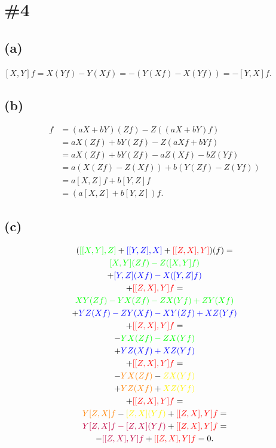 \documentclass{article}
\begin{document}
\section*{\#4}

\subsection*{(a)}
$[X,Y]f=X(Yf)-Y(Xf)=-(Y(Xf)-X(Yf))=-[Y,X]f$.

\subsection*{(b)}
\begin{align*}
[aX+bY,Z]f
&=(aX+bY)(Zf)-Z((aX+bY)f)\\
&=aX(Zf)+bY(Zf)-Z(aXf+bYf)\\
&=aX(Zf)+bY(Zf)-aZ(Xf)-bZ(Yf)\\
&=a(X(Zf)-Z(Xf))+b(Y(Zf)-Z(Yf))\\
&=a[X,Z]f+b[Y,Z]f\\
&=(a[X,Z]+b[Y,Z])f.
\end{align*}

\subsection*{(c)}
\begin{multline*}
(\textcolor{green}{[[X,Y],Z]} +\textcolor{blue}{[[Y,Z],X]} +\textcolor{red}{[[Z,X],Y]})(f)=\\
	\textcolor{green}{[X,Y](Zf)-Z([X,Y]f)}\\
	+\textcolor{blue}{[Y,Z](Xf)-X([Y,Z]f)}\\
	+\textcolor{red}{[[Z,X],Y]f}=\\
\textcolor{green}{XY(Zf)-YX(Zf)-ZX(Yf)+ZY(Xf)}\\
+\textcolor{blue}{YZ(Xf)-ZY(Xf)-XY(Zf)+XZ(Yf)}\\
+\textcolor{red}{[[Z,X],Y]f}=\\
-\textcolor{green}{YX(Zf)-ZX(Yf)}\\
+\textcolor{blue}{YZ(Xf)+XZ(Yf)}\\
+\textcolor{red}{[[Z,X],Y]f}=\\
-\textcolor{orange}{YX(Zf)}-\textcolor{yellow}{ZX(Yf)}\\
+\textcolor{orange}{YZ(Xf)}+\textcolor{yellow}{XZ(Yf)}\\
+\textcolor{red}{[[Z,X],Y]f}=\\
\textcolor{orange}{Y[Z,X]f}-\textcolor{yellow}{[Z,X](Yf)}+\textcolor{red}{[[Z,X],Y]f}=\\
\textcolor{purple}{Y[Z,X]f-[Z,X](Yf)}+\textcolor{red}{[[Z,X],Y]f}=\\
-\textcolor{purple}{[[Z,X],Y]f}+\textcolor{red}{[[Z,X],Y]f}=0.
\end{multline*}
\end{document}

